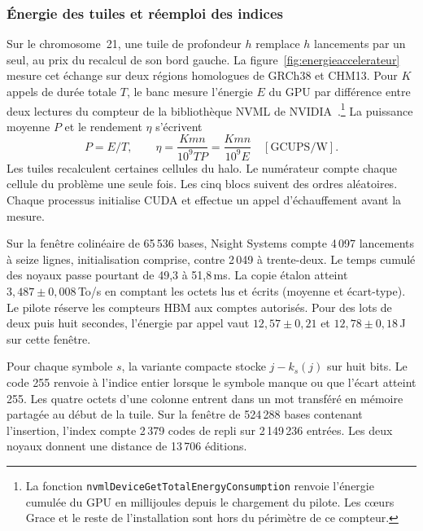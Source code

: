 \subsubsection{Énergie des tuiles et réemploi des indices}\label{sec:energie-accelerateur}
Sur le chromosome~21, une tuile de profondeur \(h\) remplace \(h\) lancements par un seul, au prix du recalcul de son bord gauche. La figure~\ref{fig:energieaccelerateur} mesure cet échange sur deux régions homologues de GRCh38 et CHM13. Pour \(K\) appels de durée totale \(T\), le banc mesure l'énergie \(E\) du GPU par différence entre deux lectures du compteur de la bibliothèque NVML de NVIDIA~\cite{nvmldocs}.\footnote{La fonction \texttt{nvmlDeviceGetTotalEnergyConsumption} renvoie l'énergie cumulée du GPU en millijoules depuis le chargement du pilote. Les cœurs Grace et le reste de l’installation sont hors du périmètre de ce compteur.} La puissance moyenne \(P\) et le rendement \(\eta\) s'écrivent
\[
 P=E/T,\qquad \eta=\frac{Kmn}{10^9 TP}=\frac{Kmn}{10^9 E}\quad[\mathrm{GCUPS/W}].
\]
Les tuiles recalculent certaines cellules du halo. Le numérateur compte chaque cellule du problème une seule fois. Les cinq blocs suivent des ordres aléatoires. Chaque processus initialise CUDA et effectue un appel d'échauffement avant la mesure.


Sur la fenêtre colinéaire de 65\,536 bases, Nsight Systems compte 4\,097 lancements à seize lignes, initialisation comprise, contre 2\,049 à trente-deux. Le temps cumulé des noyaux passe pourtant de 49,3 à 51,8\,ms. La copie étalon atteint \(3{,}487\pm0{,}008\)\,To/s en comptant les octets lus et écrits (moyenne et écart-type). Le pilote réserve les compteurs HBM aux comptes autorisés. Pour des lots de deux puis huit secondes, l'énergie par appel vaut \(12{,}57\pm0{,}21\) et \(12{,}78\pm0{,}18\)\,J sur cette fenêtre.

Pour chaque symbole \(s\), la variante compacte stocke \(j-k_s(j)\) sur huit bits. Le code 255 renvoie à l'indice entier lorsque le symbole manque ou que l'écart atteint 255. Les quatre octets d'une colonne entrent dans un mot transféré en mémoire partagée au début de la tuile. Sur la fenêtre de 524\,288 bases contenant l’insertion, l’index compte 2\,379 codes de repli sur 2\,149\,236 entrées. Les deux noyaux donnent une distance de 13\,706 éditions.

